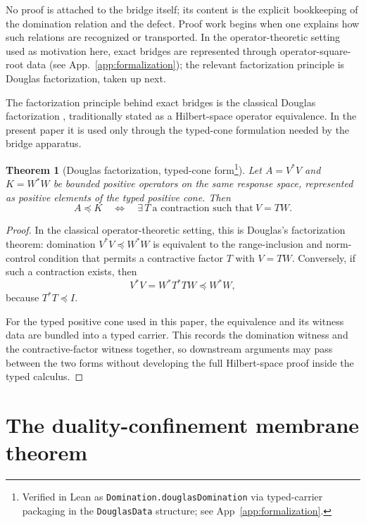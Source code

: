 \documentclass[11pt]{article}
\newtheorem{theorem}{Theorem}[section]
\theoremstyle{definition}
\begin{document}
No proof is attached to the bridge itself; its content is the explicit
bookkeeping of the domination relation and the defect.
Proof work begins when one explains how such relations are
recognized or transported.  In the operator-theoretic setting used
as motivation here, exact bridges are represented through
operator-square-root data (see App.~\ref{app:formalization}); the
relevant factorization principle is Douglas factorization, taken
up next.

The factorization principle behind exact bridges is the classical
Douglas factorization \citep{Douglas1966}, traditionally stated as
a Hilbert-space operator equivalence.  In the present paper it is
used only through the typed-cone formulation needed by the bridge
apparatus.

\begin{theorem}[Douglas factorization, typed-cone form\protect\footnote{Verified in Lean as \nolinkurl{Domination.douglasDomination} via typed-carrier packaging in the \nolinkurl{DouglasData} structure; see App~\ref{app:formalization}.}]
\label{thm:duality_confinement:douglas-domination}
Let \(A=V^*V\) and \(K=W^*W\) be bounded positive operators on the
same response space, represented as positive elements of the typed
positive cone.  Then
\[
  A\preceq K
  \quad\Longleftrightarrow\quad
  \exists\,T\ \text{a contraction such that}\ V=TW.
\]
\end{theorem}

\begin{proof}
In the classical operator-theoretic setting, this is Douglas's
factorization theorem: domination \(V^*V\preceq W^*W\) is equivalent
to the range-inclusion and norm-control condition that permits a
contractive factor \(T\) with \(V=TW\).  Conversely, if such a
contraction exists, then
\[
  V^*V = W^*T^*TW \preceq W^*W,
\]
because \(T^*T\preceq I\).

For the typed positive cone used in this paper, the equivalence and
its witness data are bundled into a typed carrier.  This records the
domination witness and the contractive-factor witness together, so
downstream arguments may pass between the two forms without
developing the full Hilbert-space proof inside the typed calculus.
\end{proof}
 

\section{The duality-confinement membrane theorem}
\label{sec:master_theorem}
\end{document}
